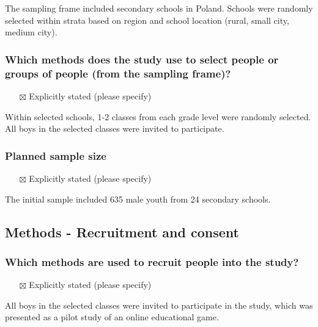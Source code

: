 \documentclass[
  doc, a4paper]{apa7}
\providecommand{\tightlist}{%
  \setlength{\itemsep}{0pt}\setlength{\parskip}{0pt}}
\begin{document}
The sampling frame included secondary schools in Poland. Schools were randomly selected within strata based on region and school location (rural, small city, medium city).

\subsubsection{Which methods does the study use to select people or groups of people (from the sampling frame)?}\label{which-methods-does-the-study-use-to-select-people-or-groups-of-people-from-the-sampling-frame}

\begin{itemize}
\tightlist
\item[$\boxtimes$]
  Explicitly stated (please specify)
\end{itemize}

Within selected schools, 1-2 classes from each grade level were randomly selected. All boys in the selected classes were invited to participate.

\subsubsection{Planned sample size}\label{planned-sample-size}

\begin{itemize}
\tightlist
\item[$\boxtimes$]
  Explicitly stated (please specify)
\end{itemize}

The initial sample included 635 male youth from 24 secondary schools.

\subsection{Methods - Recruitment and consent}\label{methods---recruitment-and-consent}

\subsubsection{Which methods are used to recruit people into the study?}\label{which-methods-are-used-to-recruit-people-into-the-study}

\begin{itemize}
\tightlist
\item[$\boxtimes$]
  Explicitly stated (please specify)
\end{itemize}

All boys in the selected classes were invited to participate in the study, which was presented as a pilot study of an online educational game.
\end{document}
